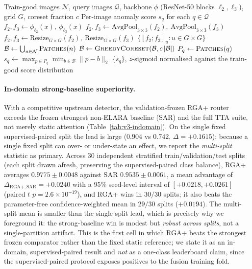 \documentclass[10pt,conference]{IEEEtran}
\begin{document}
\begin{algorithm}[t]
\caption{Patch-level PatchCore upstream detector (per modality)}
\label{alg:patchcore}
\begin{algorithmic}[1]
\Require Train-good images $\mathcal{N}$, query images $\mathcal{Q}$, backbone $\phi$ (ResNet-50 blocks $\ell_2,\ell_3$), grid $G$, coreset fraction $c$
\Ensure Per-image anomaly score $s_q$ for each $q \in \mathcal{Q}$
    \State $f_2,f_3 \gets \phi_{\ell_2}(x),\ \phi_{\ell_3}(x)$ 
    \State $f_2,f_3 \gets \text{AvgPool}_{3\times3}(f_2),\ \text{AvgPool}_{3\times3}(f_3)$ 
    \State $f_2,f_3 \gets \text{Resize}_{G\times G}(f_2),\ \text{Resize}_{G\times G}(f_3)$
    \State \Return $\{[f_2;f_3]_{u} : u \in G\times G\}$ 
\EndFunction
\State $\mathcal{B} \gets \bigcup_{n \in \mathcal{N}} \textsc{Patches}(n)$ 
\State $\mathcal{B} \gets \textsc{GreedyCoreset}(\mathcal{B}, c\,|\mathcal{B}|)$ 
    \State $P_q \gets \textsc{Patches}(q)$
    \State $s_q \gets \max_{p \in P_q} \min_{b \in \mathcal{B}} \lVert p-b \rVert_2$ 
\EndFor
\State \Return $\{s_q\}$, $z$-sigmoid normalised against the train-good score distribution
\end{algorithmic}
\end{algorithm}

\paragraph{In-domain strong-baseline superiority.} With a competitive
upstream detector, the validation-frozen RGA+ router exceeds the frozen
strongest non-ELARA baseline (SAR) and the full TTA suite, not merely
static attention (Table~\ref{tab:v3-indomain}). On the single fixed
supervised-paired split the lead is large ($0.904$ vs $0.742$,
$\Delta=+0.1615$); because a single fixed split can over- or
under-state an effect, we report the \emph{multi-split} statistic as
primary. Across $30$ independent stratified train/validation/test splits
(each split drawn afresh, preserving the supervised-paired class
balance), RGA+ averages $0.9775 \pm 0.0048$ against SAR
$0.9535 \pm 0.0061$, a mean advantage of
$\Delta_{\text{RGA+},\,\text{SAR}} = +0.0240$ with a $95\%$ seed-level
interval of $[+0.0218,+0.0261]$ (paired $t$ $p = 2.6\times10^{-19}$),
and RGA+ wins in $30/30$ splits; it also beats the parameter-free
confidence-weighted mean in $29/30$ splits ($+0.0194$). The multi-split
mean is smaller than the single-split lead, which is precisely why we
foreground it: the strong-baseline win is modest but \emph{robust across
splits}, not a single-partition artifact. This is the first cell in
which RGA+ beats the strongest frozen comparator rather than the fixed
static reference; we state it as an in-domain, supervised-paired result
and \emph{not} as a one-class leaderboard claim, since the
supervised-paired protocol exposes positives to the fusion training
fold.
\end{document}

